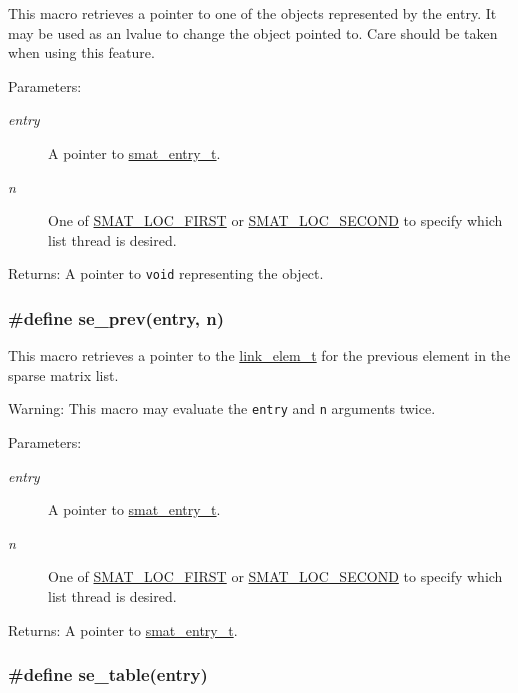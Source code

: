 This macro retrieves a pointer to one of the objects represented by the entry. It may be used as an lvalue to change the object pointed to. Care should be taken when using this feature.

\begin{Desc}
\item[Parameters:]
\begin{description}
\item[{\em entry}]A pointer to \hyperlink{group__dbprim__smat_a2}{smat\_\-entry\_\-t}. \item[{\em n}]One of \hyperlink{group__dbprim__smat_a47a135}{SMAT\_\-LOC\_\-FIRST} or \hyperlink{group__dbprim__smat_a47a136}{SMAT\_\-LOC\_\-SECOND} to specify which list thread is desired.\end{description}
\end{Desc}
\begin{Desc}
\item[Returns:]A pointer to {\tt void} representing the object. \end{Desc}
\hypertarget{group__dbprim__smat_a44}{
\subsubsection[se\_\-prev]{\setlength{\rightskip}{0pt plus 5cm}\#define se\_\-prev(entry, n)}}
\label{group__dbprim__smat_a44}


This macro retrieves a pointer to the \hyperlink{group__dbprim__link_a1}{link\_\-elem\_\-t} for the previous element in the sparse matrix list.

\begin{Desc}
\item[Warning:]This macro may evaluate the {\tt entry} and {\tt n} arguments twice.\end{Desc}
\begin{Desc}
\item[Parameters:]
\begin{description}
\item[{\em entry}]A pointer to \hyperlink{group__dbprim__smat_a2}{smat\_\-entry\_\-t}. \item[{\em n}]One of \hyperlink{group__dbprim__smat_a47a135}{SMAT\_\-LOC\_\-FIRST} or \hyperlink{group__dbprim__smat_a47a136}{SMAT\_\-LOC\_\-SECOND} to specify which list thread is desired.\end{description}
\end{Desc}
\begin{Desc}
\item[Returns:]A pointer to \hyperlink{group__dbprim__smat_a2}{smat\_\-entry\_\-t}. \end{Desc}
\hypertarget{group__dbprim__smat_a39}{
\subsubsection[se\_\-table]{\setlength{\rightskip}{0pt plus 5cm}\#define se\_\-table(entry)}}
\label{group__dbprim__smat_a39}


